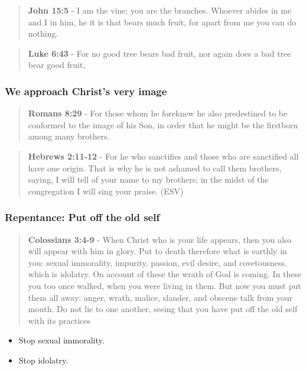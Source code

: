 \documentclass[11pt]{article}
\begin{document}
\begin{quote}
\textbf{John 15:5} - I am the vine; you are the branches. Whoever abides in me and I in him, he it is that bears much fruit, for apart from me you can do nothing.
\end{quote}

\begin{quote}
\textbf{Luke 6:43} - For no good tree bears bad fruit, nor again does a bad tree bear good fruit,
\end{quote}

\subsubsection{We approach Christ's very image}
\label{sec:org5bed0bf}
\begin{quote}
\textbf{Romans 8:29} - For those whom he foreknew he also predestined to be conformed to the image of his Son, in order that he might be the firstborn among many brothers.
\end{quote}

\begin{quote}
\textbf{Hebrews 2:11-12} -  For he who sanctifies and those who are sanctified all have one origin.  That is why he is not ashamed to call them brothers, saying, I will tell of your name to my brothers; in the midst of the congregation I will sing your praise.  (ESV)
\end{quote}

\subsubsection{Repentance: Put off the old self}
\label{sec:orga2fc093}
\begin{quote}
\textbf{Colossians 3:4-9} - When Christ who is your life appears, then you also will appear with him in glory. Put to death therefore what is earthly in you: sexual immorality, impurity, passion, evil desire, and covetousness, which is idolatry. On account of these the wrath of God is coming. In these you too once walked, when you were living in them. But now you must put them all away: anger, wrath, malice, slander, and obscene talk from your mouth. Do not lie to one another, seeing that you have put off the old self with its practices
\end{quote}

\begin{itemize}
\item Stop sexual immorality.
\item Stop idolatry.
\end{itemize}
\end{document}
